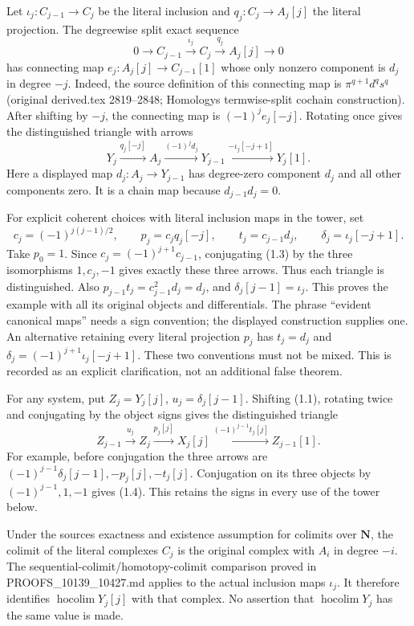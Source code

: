 Let \(\iota_j:C_{j-1}\to C_j\) be the literal inclusion and \(q_j:C_j\to A_j[j]\) the literal projection. The degreewise split exact sequence \[
0\longrightarrow C_{j-1}\xrightarrow{\iota_j}C_j
 \xrightarrow{q_j}A_j[j]\longrightarrow0
\] has connecting map \(e_j:A_j[j]\to C_{j-1}[1]\) whose only nonzero component is \(d_j\) in degree \(-j\). Indeed,\allowbreak{} the source definition of this connecting map is \(\pi^{q+1}d^q s^q\) (original derived.tex 2819–\allowbreak{}2848; Homology\textquotesingle s termwise-split cochain construction)\allowbreak{}. After shifting by \(-j\),\allowbreak{} the connecting map is \((-1)^j e_j[-j]\). Rotating once gives the distinguished triangle with arrows \[
Y_j\xrightarrow{q_j[-j]}A_j
 \xrightarrow{(-1)^j d_j}Y_{j-1}
 \xrightarrow{-\iota_j[-j+1]}Y_j[1]. \tag{1.3}
\] Here a displayed map \(d_j:A_j\to Y_{j-1}\) has degree-zero component \(d_j\) and all other components zero. It is a chain map because \(d_{j-1}d_j=0\).

For explicit coherent choices with literal inclusion maps in the tower,\allowbreak{} set \[
c_j=(-1)^{j(j-1)/2},\qquad
p_j=c_j q_j[-j],\qquad t_j=c_{j-1}d_j,\qquad
\delta_j=\iota_j[-j+1].
\] Take \(p_0=1\). Since \(c_j=(-1)^{j+1}c_{j-1}\),\allowbreak{} conjugating (1.3)\allowbreak{} by the three isomorphisms \(1,c_j,-1\) gives exactly these three arrows. Thus each triangle is distinguished. Also \(p_{j-1}t_j=c_{j-1}^2d_j=d_j\),\allowbreak{} and \(\delta_j[j-1]=\iota_j\). This proves the example with all its original objects and differentials. The phrase ``evident canonical maps'' needs a sign convention; the displayed construction supplies one. An alternative retaining every literal projection \(p_j\) has \(t_j=d_j\) and \(\delta_j=(-1)^{j+1}\iota_j[-j+1]\). These two conventions must not be mixed. This is recorded as an explicit clarification,\allowbreak{} not an additional false theorem.

For any system,\allowbreak{} put \(Z_j=Y_j[j]\),\allowbreak{} \(u_j=\delta_j[j-1]\). Shifting (1.1)\allowbreak{},\allowbreak{} rotating twice and conjugating by the object signs gives the distinguished triangle \[
Z_{j-1}\xrightarrow{u_j}Z_j\xrightarrow{p_j[j]}X_j[j]
 \xrightarrow{(-1)^{j-1}t_j[j]}Z_{j-1}[1]. \tag{1.4}
\] For example,\allowbreak{} before conjugation the three arrows are \((-1)^{j-1}\delta_j[j-1],-p_j[j],-t_j[j]\). Conjugation on its three objects by \((-1)^{j-1},1,-1\) gives (1.4)\allowbreak{}. This retains the signs in every use of the tower below.

Under the source\textquotesingle s exactness and existence assumption for colimits over \(\mathbf N\),\allowbreak{} the colimit of the literal complexes \(C_j\) is the original complex with \(A_i\) in degree \(-i\). The sequential-colimit/\allowbreak{}homotopy-colimit comparison proved in PROOFS\_\allowbreak{}10139\_\allowbreak{}10427.md applies to the actual inclusion maps \(\iota_j\). It therefore identifies \(\operatorname{hocolim}Y_j[j]\) with that complex. No assertion that \(\operatorname{hocolim}Y_j\) has the same value is made.

